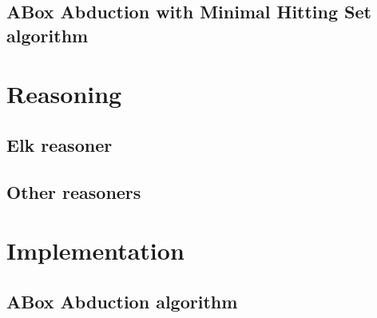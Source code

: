 \documentclass[12pt,a4paper]{article}
\begin{document}
\subsection{ABox Abduction with Minimal Hitting Set algorithm}



\section{Reasoning}


		

\subsection{Elk reasoner}

\subsection{Other reasoners}

\section{Implementation}

\subsection{ABox Abduction algorithm}
\end{document}
